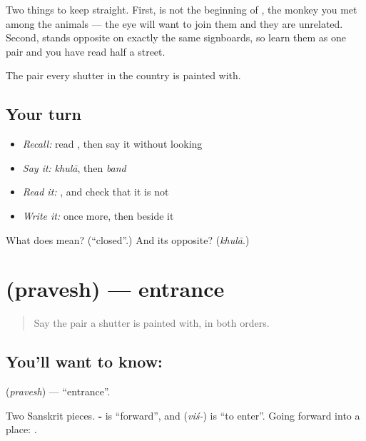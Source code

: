 Two things to keep straight. First,  is not the beginning of \textbf{}, the monkey you met among the animals — the eye will want to join them and they are unrelated. Second,  stands opposite  on exactly the same signboards, so learn them as one pair and you have read half a street.

\begin{grammarlens}[title={What you've built}]
The pair every shutter in the country is painted with.
\end{grammarlens}

\subsection*{Your turn}
\begin{itemize}
\raggedright
  \item \emph{Recall:} read \textbf{}, then say it without looking
  \item \emph{Say it:} \emph{khulā}, then \emph{band}
  \item \emph{Read it:} , and check that it is not 
  \item \emph{Write it:}  once more, then  beside it
\end{itemize}

\begin{tcolorbox}[breakable,colback=teal!4,colframe=teal!35!black,title={Before you move on}]
What does  mean? (\textquotedblleft{}closed\textquotedblright{}.) And its opposite? (\emph{khulā}.)
\end{tcolorbox}
\section[pravesh]{ (pravesh) — entrance}

\label{lesson:HI-C74-entrance}



\begin{quote}
Say the pair a shutter is painted with, in both orders.
\end{quote}

\subsection*{You'll want to know: }
\textbf{} (\emph{pravesh}) — \textquotedblleft{}entrance\textquotedblright{}.

Two Sanskrit pieces. \textbf{-} is \textquotedblleft{}forward\textquotedblright{}, and \textbf{} (\emph{viś-}) is \textquotedblleft{}to enter\textquotedblright{}. Going forward into a place: .


